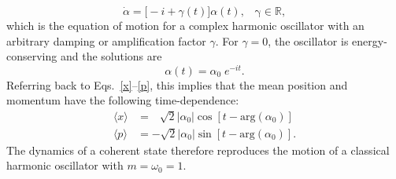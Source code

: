 \documentclass[prx,12pt]{revtex4-2}
\begin{document}
\begin{equation}
  \dot{\alpha} = \big[-i + \gamma(t)\big] \alpha(t), \;\;\; \mathrm{\gamma}\in\mathbb{R},
\end{equation}
which is the equation of motion for a complex harmonic oscillator with
an arbitrary damping or amplification factor $\gamma$.  For $\gamma =
0$, the oscillator is energy-conserving and the solutions are
\begin{equation}
  \alpha(t) = \alpha_0 \; e^{-it}.
\end{equation}
Referring back to Eqs.~\eqref{x}--\eqref{p}, this implies that the
mean position and momentum have the following time-dependence:
\begin{align}
  \langle x\rangle &=\, \;\;\sqrt{2} |\alpha_0| \cos\left[t - \mathrm{arg}(\alpha_0)\right] \\
  \langle p\rangle &= -\sqrt{2} |\alpha_0| \sin\left[t - \mathrm{arg}(\alpha_0)\right].
\end{align}
The dynamics of a coherent state therefore reproduces the motion of a
classical harmonic oscillator with $m = \omega_0 = 1$.
\end{document}
